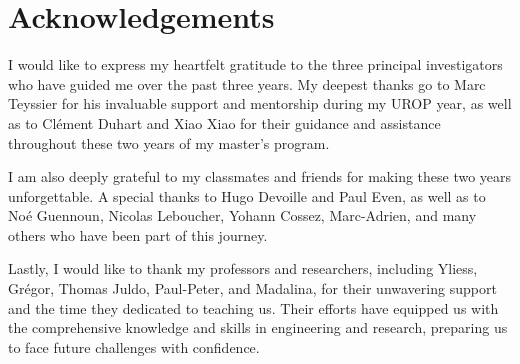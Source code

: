 \vspace*{\fill}

\section*{Acknowledgements}

I would like to express my heartfelt gratitude to the three principal investigators who have guided me over the past three years. My deepest thanks go to Marc Teyssier for his invaluable support and mentorship during my UROP year, as well as to Clément Duhart and Xiao Xiao for their guidance and assistance throughout these two years of my master’s program.

I am also deeply grateful to my classmates and friends for making these two years unforgettable. A special thanks to Hugo Devoille and Paul Even, as well as to Noé Guennoun, Nicolas Leboucher, Yohann Cossez, Marc-Adrien, and many others who have been part of this journey.

Lastly, I would like to thank my professors and researchers, including Yliess, Grégor, Thomas Juldo, Paul-Peter, and Madalina, for their unwavering support and the time they dedicated to teaching us. Their efforts have equipped us with the comprehensive knowledge and skills in engineering and research, preparing us to face future challenges with confidence.
\vspace*{\fill}
